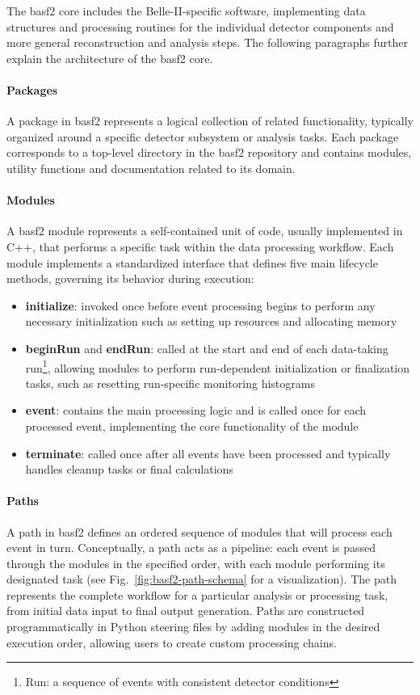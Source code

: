 The basf2 core includes the Belle-II-specific software, implementing data structures and processing routines for the individual detector components and more general reconstruction and analysis steps. The following paragraphs further explain the architecture of the basf2 core.

\paragraph{Packages}
A package in basf2 represents a logical collection of related functionality, typically organized around a specific detector subsystem or analysis tasks.
Each package corresponds to a top-level directory in the basf2 repository and contains modules, utility functions and documentation related to its domain.

\paragraph{Modules}
A basf2 module represents a self-contained unit of code, usually implemented in C++, that performs a specific task within the data processing workflow.
Each module implements a standardized interface that defines five main lifecycle methods, governing its behavior during execution:
\begin{itemize}[topsep=0pt]
    \item \textbf{initialize}: invoked once before event processing begins to perform any necessary initialization such as setting up resources and allocating memory
    \item \textbf{beginRun} and \textbf{endRun}: called at the start and end of each data-taking run\footnote{%
        Run: a sequence of events with consistent detector conditions
    }, allowing modules to perform run-dependent initialization or finalization tasks, such as resetting run-specific monitoring histograms
    \item \textbf{event}: contains the main processing logic and is called once for each processed event, implementing the core functionality of the module
    \item \textbf{terminate}: called once after all events have been processed and typically handles cleanup tasks or final calculations
\end{itemize}

\paragraph{Paths}
A path in basf2 defines an ordered sequence of modules that will process each event in turn.
Conceptually, a path acts as a pipeline: each event is passed through the modules in the specified order, with each module performing its designated task (see Fig.\ \ref{fig:basf2-path-schema} for a visualization).
The path represents the complete workflow for a particular analysis or processing task, from initial data input to final output generation.
Paths are constructed programmatically in Python steering files by adding modules in the desired execution order, allowing users to create custom processing chains.

